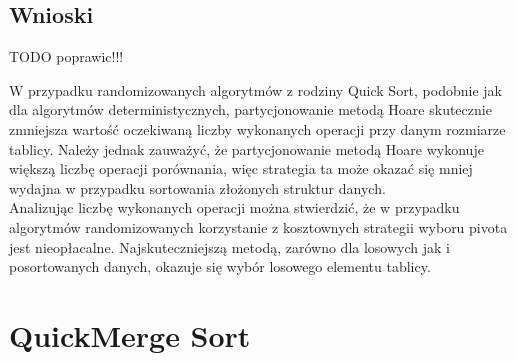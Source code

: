 \begin{figure}[]
	\centering
	
	\caption[]{}
	\label{fig:quick-sort-nondeterministic-pivot-cost-factor}
\end{figure}

\begin{figure}[]
	\centering
	
	\caption[]{}
	\label{fig:quick-sort-nondeterministic-pivot-density}
\end{figure}

\begin{figure}[]
	\centering
	
	\caption[]{}
	\label{fig:quick-sort-nondeterministic-pivot-random-all}
\end{figure}

\subsection{Wnioski}
TODO poprawic!!!

W przypadku randomizowanych algorytmów z rodziny Quick Sort, podobnie jak dla algorytmów deterministycznych, partycjonowanie metodą Hoare skutecznie zmniejsza wartość oczekiwaną liczby wykonanych operacji przy danym rozmiarze tablicy. Należy jednak zauważyć, że partycjonowanie metodą Hoare wykonuje większą liczbę operacji porównania, więc strategia ta może okazać się mniej wydajna w przypadku sortowania złożonych struktur danych.\\

Analizując liczbę wykonanych operacji można stwierdzić, że w przypadku algorytmów randomizowanych korzystanie z kosztownych strategii wyboru pivota jest nieopłacalne. Najskuteczniejszą metodą, zarówno dla losowych jak i posortowanych danych, okazuje się wybór losowego elementu tablicy.\\


\section{QuickMerge Sort}

